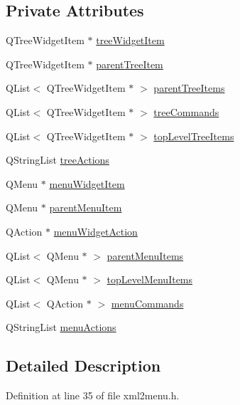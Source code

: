 \subsection*{Private Attributes}
\begin{DoxyCompactItemize}
\item 
QTreeWidgetItem $\ast$ \hyperlink{classXML2Menu_a13cea0b23ecf22219630e4f790b3100d}{treeWidgetItem}
\item 
QTreeWidgetItem $\ast$ \hyperlink{classXML2Menu_a165191c6389fde7fb84b297d55b39637}{parentTreeItem}
\item 
QList$<$ QTreeWidgetItem $\ast$ $>$ \hyperlink{classXML2Menu_a236e5e92260fd3f5e3442770cd830325}{parentTreeItems}
\item 
QList$<$ QTreeWidgetItem $\ast$ $>$ \hyperlink{classXML2Menu_ab2decbff5105065ab9f97bcc733350da}{treeCommands}
\item 
QList$<$ QTreeWidgetItem $\ast$ $>$ \hyperlink{classXML2Menu_a546c44f9da1506ff7d3f5f4903702550}{topLevelTreeItems}
\item 
QStringList \hyperlink{classXML2Menu_aabba060620e79a1008c49d6da80d9d8c}{treeActions}
\item 
QMenu $\ast$ \hyperlink{classXML2Menu_aef3b2dd32010ef176178277075ddb0e2}{menuWidgetItem}
\item 
QMenu $\ast$ \hyperlink{classXML2Menu_a502707dcd0dde7d0b74b33cb0e03bd9a}{parentMenuItem}
\item 
QAction $\ast$ \hyperlink{classXML2Menu_a9a8070ff51e88a2d9bbdcb476c701b96}{menuWidgetAction}
\item 
QList$<$ QMenu $\ast$ $>$ \hyperlink{classXML2Menu_a1f7a54c39f5f96f607d6bc9acdba422e}{parentMenuItems}
\item 
QList$<$ QMenu $\ast$ $>$ \hyperlink{classXML2Menu_ac5ac423657c0b6f87d8b66ac67d49eaa}{topLevelMenuItems}
\item 
QList$<$ QAction $\ast$ $>$ \hyperlink{classXML2Menu_a6b956ab3cc4eb0e148736a077b003a50}{menuCommands}
\item 
QStringList \hyperlink{classXML2Menu_a6358d28b430761cd31987607d583af39}{menuActions}
\end{DoxyCompactItemize}


\subsection{Detailed Description}


Definition at line 35 of file xml2menu.h.



